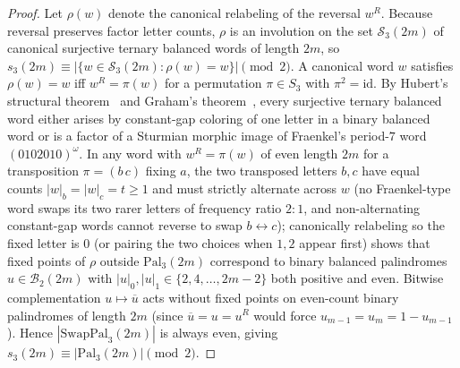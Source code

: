 \documentclass[11pt,a4paper]{article}
\theoremstyle{definition}
\newcommand{\Pal}{\mathrm{Pal}}
\newcommand{\SwapPal}{\mathrm{SwapPal}}
\begin{document}
\begin{proof}
Let $\rho(w)$ denote the canonical relabeling of the reversal $w^R$. Because reversal preserves factor letter counts, $\rho$ is an involution on the set $\mathcal{S}_3(2m)$ of canonical surjective ternary balanced words of length $2m$, so $s_3(2m) \equiv |\{w \in \mathcal{S}_3(2m) : \rho(w) = w\}| \pmod 2$. A canonical word $w$ satisfies $\rho(w) = w$ iff $w^R = \pi(w)$ for a permutation $\pi \in S_3$ with $\pi^2 = \mathrm{id}$. By Hubert's structural theorem~\cite{Hubert2000} and Graham's theorem~\cite{Graham1973}, every surjective ternary balanced word either arises by constant-gap coloring of one letter in a binary balanced word or is a factor of a Sturmian morphic image of Fraenkel's period-$7$ word $(0102010)^\omega$. In any word with $w^R = \pi(w)$ of even length $2m$ for a transposition $\pi = (b\,c)$ fixing $a$, the two transposed letters $b, c$ have equal counts $|w|_b = |w|_c = t \ge 1$ and must strictly alternate across $w$ (no Fraenkel-type word swaps its two rarer letters of frequency ratio $2:1$, and non-alternating constant-gap words cannot reverse to swap $b \leftrightarrow c$); canonically relabeling so the fixed letter is $0$ (or pairing the two choices when $1, 2$ appear first) shows that fixed points of $\rho$ outside $\Pal_3(2m)$ correspond to binary balanced palindromes $u \in \mathcal{B}_2(2m)$ with $|u|_0, |u|_1 \in \{2, 4, \dots, 2m-2\}$ both positive and even. Bitwise complementation $u \mapsto \overline{u}$ acts without fixed points on even-count binary palindromes of length $2m$ (since $\overline{u} = u = u^R$ would force $u_{m-1} = u_m = 1 - u_{m-1}$). Hence $|\SwapPal_3(2m)|$ is always even, giving $s_3(2m) \equiv |\Pal_3(2m)| \pmod 2$.


\end{proof}
\end{document}
